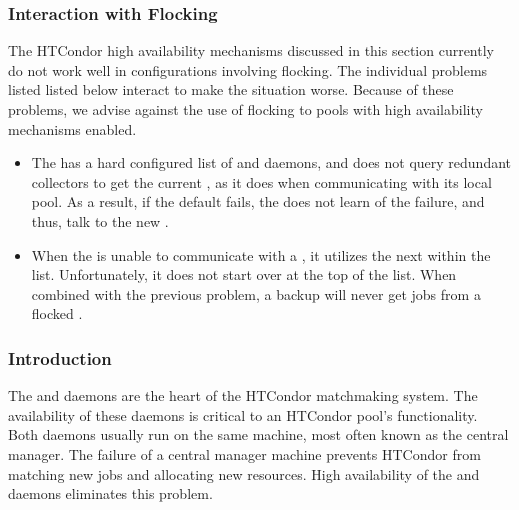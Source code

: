 \subsubsection{\label{sec:HA-not-with-flocking} Interaction with Flocking} 

The HTCondor high availability mechanisms discussed in this section
currently do not work well in configurations involving flocking.
The individual problems listed listed below interact to make the situation
worse.
Because of these problems, we advise against the use of
flocking to pools with high availability mechanisms enabled.

\begin{itemize}
\item The  has a hard configured list of
 and  daemons, 
and does not query
redundant collectors to get the current , 
as it does when communicating with its local pool.
As a result, if the
default  fails, the  does not learn
of the failure,
and thus, talk to the new .

\item When the  is unable to communicate with a
, it utilizes the next 
within the list.
Unfortunately, it does not start over at the top of the list.
When combined with the previous problem,
a backup  will never get
jobs from a flocked .

\end{itemize}

\subsubsection{\label{sec:HA-of-CM-intro} Introduction} 

The  and  daemons
are the heart of the HTCondor matchmaking system.
The availability of these daemons is critical to an HTCondor pool's
functionality.
Both daemons usually run on the same machine,
most often known as the central manager.
The failure of a central manager machine prevents HTCondor from matching
new jobs and allocating new resources.
High availability of the  and  daemons
eliminates this problem. 

